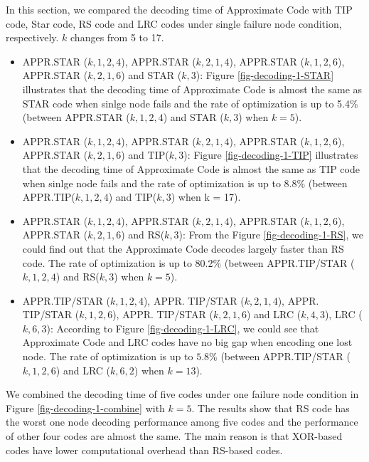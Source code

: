 \documentclass[sigconf]{acmart}
\begin{document}
In this section, we compared the decoding time of Approximate Code with TIP code, Star code, RS code and LRC codes under single failure node condition, respectively. $k$ changes from 5 to 17. 
\begin{itemize}
    \item APPR.STAR ($k,1,2,4$), APPR.STAR ($k,2,1,4$), APPR.STAR ($k,1,2,6$), APPR.STAR ($k,2,1,6$) and STAR ($k,3$): Figure \ref{fig-decoding-1-STAR} illustrates that the decoding time of Approximate Code is almost the same as STAR code when sinlge node fails and the rate of optimization is up to 5.4\% (between APPR.STAR ($k,1,2,4$) and STAR ($k,3$) when $k = 5$). 
    \item APPR.STAR ($k,1,2,4$), APPR.STAR ($k,2,1,4$), APPR.STAR ($k,1,2,6$), APPR.STAR ($k,2,1,6$) and TIP($k,3$): Figure \ref{fig-decoding-1-TIP} illustrates that the decoding time of Approximate Code is almost the same as TIP code when sinlge node fails and the rate of optimization is up to 8.8\% (between APPR.TIP($k,1,2,4$) and TIP($k,3$) when k = 17).
    \item APPR.STAR ($k,1,2,4$), APPR.STAR ($k,2,1,4$), APPR.STAR ($k,1,2,6$), APPR.STAR ($k,2,1,6$) and RS($k,3$): From the Figure \ref{fig-decoding-1-RS}, we could find out that the Approximate Code decodes largely faster than RS code. The rate of optimization is up to 80.2\% (between APPR.TIP/STAR ($k,1,2,4$) and RS($k,3$) when $k = 5$).
    \item APPR.TIP/STAR ($k,1,2,4$), APPR. TIP/STAR ($k,2,1,4$), APPR. TIP/STAR ($k,1,2,6$), APPR. TIP/STAR ($k,2,1,6$) and LRC ($k,4,3$), LRC  ($k,6,3$):  According to Figure \ref{fig-decoding-1-LRC}, we could see that Approximate Code and LRC codes have no big gap when encoding one lost node. The rate of optimization is up to $5.8\%$ (between APPR.TIP/STAR ($k,1,2,6$) and LRC ($k, 6, 2$) when $k = 13$).
\end{itemize}

We combined the decoding time of five codes under one failure node condition in Figure \ref{fig-decoding-1-combine} with $k=5$. The results show that RS code has the worst one node decoding performance among five codes and the performance of other four codes are almost the same. The main reason is that XOR-based codes have lower computational overhead than RS-based codes.\par
\end{document}
